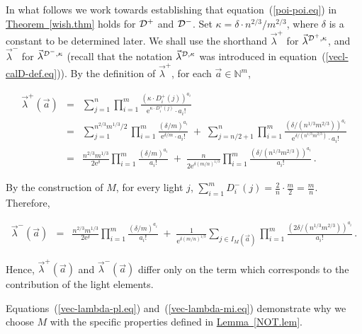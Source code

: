 \documentclass[10pt]{article}
\theoremstyle{definition}
\numberwithin{equation}{section}
\newcommand{\expref}[2]{\texorpdfstring{\hyperref[#2]{#1~\ref{#2}}}{#1~\ref{#2}}}
\newcommand{\eee}{\mathrm e}  %
\newcommand{\calD}{{\cal D}}
\newcommand{\BEQN}{\begin{eqnarray}}\newcommand{\EEQN}{\end{eqnarray}}
\newcommand{\w}{\kappa}
\begin{document}
In what follows we work towards establishing that
 equation~(\ref{poi-poi.eq}) in \expref{Theorem}{wish.thm} holds for
$\calD^+$ and $\calD^-$.
Set $\w = \delta \cdot {n^{2/3}}/{m^{2/3}}$, where $\delta$ is a constant to be determined later.
We shall use the shorthand
$\vec{\lambda}^+$ for $\vec{\lambda}^{\calD^+,\w}$, and
$\vec{\lambda}^-$ for $\vec{\lambda}^{\calD^-,\w}$
(recall that the notation $\vec{\lambda}^{\calD,\w}$
was introduced in equation~(\ref{vecl-calD-def.eq})).
By the definition of $\vec{\lambda}^+$, for each
$\vec{a} \in \mathbb{N}^m$,

\BEQN
\vec{\lambda}^+(\vec{a})
&=&
   \sum_{j=1}^n\prod_{i=1}^m \frac{(\w\cdot D^+_i(j))^{a_i}}{\eee^{\w\cdot D^+_i(j)} \cdot a_i!}\\
&=& \sum_{j=1}^{n^{2/3}m^{1/3}/2}\prod_{i=1}^m  \frac{(\delta/m)^{a_i}}{\eee^{\delta/m}\cdot a_i!}
\;+\; \sum_{j=n/2+1}^n \prod_{i=1}^m \frac{(\delta/(n^{1/3}m^{2/3}))^{a_i}}{\eee^{\delta/(n^{1/3} m^{2/3})}\cdot a_i!} \\
&=&\frac{n^{2/3} m^{1/3}}{2\eee^{\delta}}\prod_{i=1}^m \frac{(\delta/m)^{a_i}}{a_i!}
\label{vec-lambda-pl.eq}
\;+\; \frac{n}{2\eee^{\delta(m/n)^{1/3}}} \prod_{i=1}^m \frac{(\delta/(n^{1/3}m^{2/3}))^{a_i}}{a_i!} \,.
\EEQN














%
By the construction of $M$, for every light $j$,
%
$\sum_{i=1}^m D^-_i(j) = \frac{2}{n}\cdot\frac{m}{2} = \frac{m}{n}$.
%
Therefore,
%
%
%
%
%
%
%
%

\BEQN
\vec{\lambda}^-(\vec{a})
&=& \frac{n^{2/3} m^{1/3}}{2\eee^{\delta}}
  \prod_{i=1}^m \frac{(\delta/m)^{a_i}}{a_i!}
\label{vec-lambda-mi.eq}
\;+\; \frac{1}{\eee^{\delta(m/n)^{1/3}}} \sum_{j\in I_M(\vec{a})} \prod_{i=1}^m
    \frac{(2\delta/(n^{1/3}m^{2/3}))^{a_i}}{a_i!}   \,.
\EEQN












%
Hence, $\vec{\lambda}^+(\vec{a})$ and $\vec{\lambda}^-(\vec{a})$ differ only
on the term which corresponds to the contribution of the light elements.

Equations~(\ref{vec-lambda-pl.eq}) and~(\ref{vec-lambda-mi.eq}) demonstrate why we choose $M$
with the specific properties defined in \expref{Lemma}{NOT.lem}.
\end{document}
